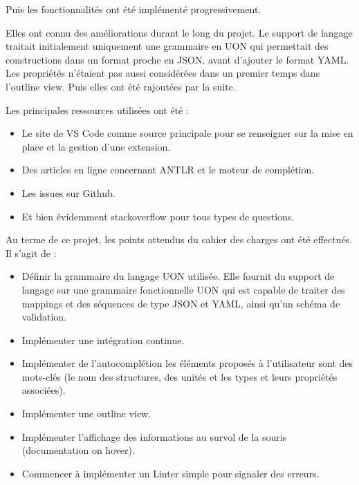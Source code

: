Puis les fonctionnalités ont été implémenté progressivement.

Elles ont connu des améliorations durant le long du projet.
Le support de langage traitait initialement uniquement une grammaire en UON qui permettait des constructions dans un format proche en JSON.
avant d'ajouter le format YAML.
Les propriétés n'étaient pas aussi considérées dans un premier temps dans l'outline view. Puis elles ont été rajoutées par la suite.

Les principales ressources utilisées ont été :

\begin{itemize}
    \item Le site de VS Code comme source principale pour se renseigner sur la mise en place et la gestion d'une extension.
    \item Des articles en ligne concernant ANTLR et le moteur de complétion.
    \item Les issues sur Github.
    \item Et bien évidemment stackoverflow pour tous types de questions.
\end{itemize}


Au terme de ce projet, les points attendus du cahier des charges ont été effectués. Il s'agit de :
\begin{itemize}
    \item Définir la grammaire du langage UON utilisée.
          \subitem Elle fournit du support de langage sur une grammaire fonctionnelle UON qui est capable de traiter des mappings et des séquences de type JSON et YAML, ainsi qu'un schéma de validation.
    \item Implémenter une intégration continue.
    \item Implémenter de l'autocomplétion
          \subitem les éléments proposés à l'utilisateur sont des mots-clés (le nom des structures, des unités et les types et leurs propriétés associées).
    \item Implémenter une outline view.
    \item Implémenter l'affichage des informations au survol de la souris (documentation on hover).
    \item Commencer à implémenter un Linter simple pour signaler des erreurs.
\end{itemize}

